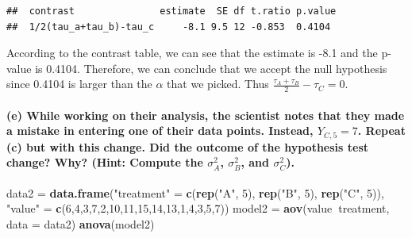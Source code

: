 \documentclass[
]{article}
\newenvironment{Shaded}{\begin{snugshade}}{\end{snugshade}}
\newcommand{\DataTypeTok}[1]{\textcolor[rgb]{0.13,0.29,0.53}{#1}}
\newcommand{\DecValTok}[1]{\textcolor[rgb]{0.00,0.00,0.81}{#1}}
\newcommand{\KeywordTok}[1]{\textcolor[rgb]{0.13,0.29,0.53}{\textbf{#1}}}
\newcommand{\NormalTok}[1]{#1}
\newcommand{\OperatorTok}[1]{\textcolor[rgb]{0.81,0.36,0.00}{\textbf{#1}}}
\newcommand{\StringTok}[1]{\textcolor[rgb]{0.31,0.60,0.02}{#1}}
\begin{document}
\begin{verbatim}
##  contrast               estimate  SE df t.ratio p.value
##  1/2(tau_a+tau_b)-tau_c     -8.1 9.5 12 -0.853  0.4104
\end{verbatim}

According to the contrast table, we can see that the estimate is -8.1
and the p-value is 0.4104. Therefore, we can conclude that we accept the
null hypothesis since 0.4104 is larger than the \(\alpha\) that we
picked. Thus \(\frac{τ_A+τ_B}2−τ_C=0\).

\hypertarget{e-while-working-on-their-analysis-the-scientist-notes-that-they-made-a-mistake-in-entering-one-of-their-data-points.-instead-y_c57.-repeat-c-but-with-this-change.-did-the-outcome-of-the-hypothesis-test-change-why-hint-compute-the-ux3c32_a-ux3c32_b-and-ux3c32_c.}{%
\paragraph{\texorpdfstring{(e) While working on their analysis, the
scientist notes that they made a mistake in entering one of their data
points. Instead, \(Y_{C,5}=7\). Repeat (c) but with this change. Did the
outcome of the hypothesis test change? Why? (Hint: Compute the
\(σ^2_A\), \(σ^2_B\), and
\(σ^2_C\)).}{(e) While working on their analysis, the scientist notes that they made a mistake in entering one of their data points. Instead, Y\_\{C,5\}=7. Repeat (c) but with this change. Did the outcome of the hypothesis test change? Why? (Hint: Compute the σ\^{}2\_A, σ\^{}2\_B, and σ\^{}2\_C).}}\label{e-while-working-on-their-analysis-the-scientist-notes-that-they-made-a-mistake-in-entering-one-of-their-data-points.-instead-y_c57.-repeat-c-but-with-this-change.-did-the-outcome-of-the-hypothesis-test-change-why-hint-compute-the-ux3c32_a-ux3c32_b-and-ux3c32_c.}}

\begin{Shaded}
\begin{Highlighting}[]
\NormalTok{data2 =}\StringTok{ }\KeywordTok{data.frame}\NormalTok{(}\StringTok{"treatment"}\NormalTok{ =}\StringTok{ }\KeywordTok{c}\NormalTok{(}\KeywordTok{rep}\NormalTok{(}\StringTok{"A"}\NormalTok{, }\DecValTok{5}\NormalTok{), }\KeywordTok{rep}\NormalTok{(}\StringTok{"B"}\NormalTok{, }\DecValTok{5}\NormalTok{), }\KeywordTok{rep}\NormalTok{(}\StringTok{"C"}\NormalTok{, }\DecValTok{5}\NormalTok{)), }\StringTok{"value"}\NormalTok{ =}\StringTok{ }\KeywordTok{c}\NormalTok{(}\DecValTok{6}\NormalTok{,}\DecValTok{4}\NormalTok{,}\DecValTok{3}\NormalTok{,}\DecValTok{7}\NormalTok{,}\DecValTok{2}\NormalTok{,}\DecValTok{10}\NormalTok{,}\DecValTok{11}\NormalTok{,}\DecValTok{15}\NormalTok{,}\DecValTok{14}\NormalTok{,}\DecValTok{13}\NormalTok{,}\DecValTok{1}\NormalTok{,}\DecValTok{4}\NormalTok{,}\DecValTok{3}\NormalTok{,}\DecValTok{5}\NormalTok{,}\DecValTok{7}\NormalTok{))}
\NormalTok{model2 =}\StringTok{ }\KeywordTok{aov}\NormalTok{(value}\OperatorTok{~}\NormalTok{treatment, }\DataTypeTok{data =}\NormalTok{ data2)}
\KeywordTok{anova}\NormalTok{(model2)}
\end{Highlighting}
\end{Shaded}
\end{document}
